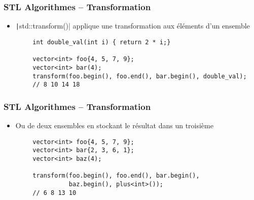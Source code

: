 \documentclass[C++.tex]{subfiles}
\begin{document}
\begin{frame}[fragile]
	\frametitle{STL Algorithmes -- Transformation}
	\begin{itemize}
		\item \texttt|std::transform()| applique une transformation aux éléments d'un ensemble
	\end{itemize}

	\begin{verbatim}
		int double_val(int i) { return 2 * i;}

		vector<int> foo{4, 5, 7, 9};
		vector<int> bar(4);
		transform(foo.begin(), foo.end(), bar.begin(), double_val);
		// 8 10 14 18
	\end{verbatim}
\end{frame}

\begin{frame}[fragile]
	\frametitle{STL Algorithmes -- Transformation}
	\begin{itemize}
		\item Ou de deux ensembles en stockant le résultat dans un troisième
	\end{itemize}

	\begin{verbatim}
		vector<int> foo{4, 5, 7, 9};
		vector<int> bar{2, 3, 6, 1};
		vector<int> baz(4);

		transform(foo.begin(), foo.end(), bar.begin(),
		          baz.begin(), plus<int>());
		// 6 8 13 10
	\end{verbatim}

\end{frame}
\end{document}
